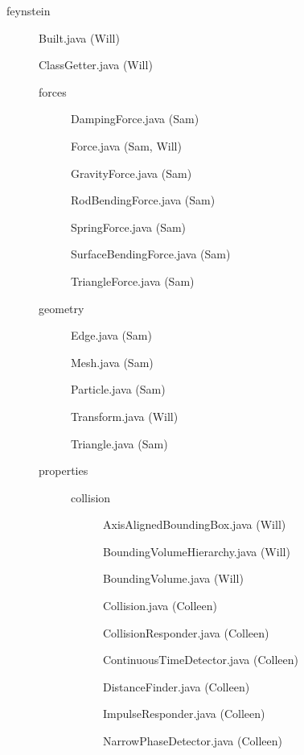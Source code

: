 \begin{description}
\item[] feynstein
  \begin{description}
  \item[] Built.java (Will)
  \item[] ClassGetter.java (Will)
  \item[] forces
    \begin{description}
    \item[] DampingForce.java (Sam)
    \item[] Force.java (Sam, Will)
    \item[] GravityForce.java (Sam)
    \item[] RodBendingForce.java (Sam)
    \item[] SpringForce.java (Sam)
    \item[] SurfaceBendingForce.java (Sam)
    \item[] TriangleForce.java (Sam)
    \end{description}
  \item[] geometry
    \begin{description}
    \item[] Edge.java (Sam)
    \item[] Mesh.java (Sam) 
    \item[] Particle.java (Sam)
    \item[] Transform.java (Will)
    \item[] Triangle.java (Sam)
    \end{description}
  \item[] properties
    \begin{description}
    \item[] collision
      \begin{description}
      \item[] AxisAlignedBoundingBox.java (Will) 
      \item[] BoundingVolumeHierarchy.java (Will)
      \item[] BoundingVolume.java (Will)
      \item[] Collision.java (Colleen)
      \item[] CollisionResponder.java (Colleen)
      \item[] ContinuousTimeDetector.java (Colleen)
      \item[] DistanceFinder.java (Colleen)
      \item[] ImpulseResponder.java (Colleen)
      \item[] NarrowPhaseDetector.java (Colleen)

\end{description}
\end{description}
\end{description}
\end{description}
